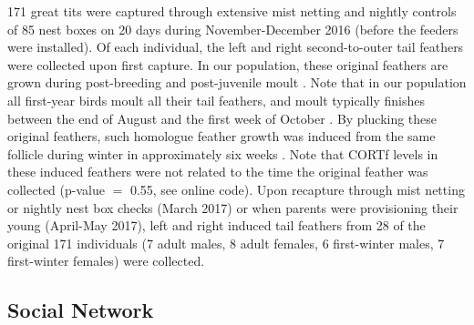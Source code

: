 \documentclass[10pt, twoside]{book} %
\begin{document}
171 great tits were captured through extensive mist netting and nightly controls of 85 nest boxes on 20 days during November-December 2016 (before the feeders were installed). Of each individual, the left and right second-to-outer tail feathers were collected upon first capture. In our population, these original feathers are grown during post-breeding and post-juvenile moult \citep{Dhondt1973}. Note that in our population all first-year birds moult all their tail feathers, and moult typically finishes between the end of August and the first week of October \citep{Dhondt1973}. By plucking these original feathers, such homologue feather growth was induced from the same follicle during winter in approximately six weeks \citep{Talloen2008}. Note that CORTf levels in these induced feathers were not related to the time the original feather was collected (p-value $=$ 0.55, see online code). Upon recapture through mist netting or nightly nest box checks (March 2017) or when parents were provisioning their young (April-May 2017), left and right induced tail feathers from 28 of the original 171 individuals (7 adult males, 8 adult females, 6 first-winter males, 7 first-winter females) were collected.\\



	\subsection*{Social Network}
	
\end{document}
